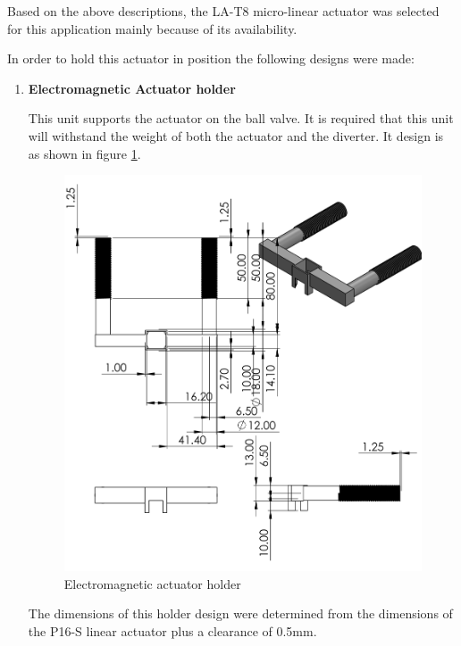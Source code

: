 Based on the above descriptions, the LA-T8 micro-linear actuator was selected for this application mainly because of its availability.
\par
In order to hold this actuator in position the following designs were made:
\begin{enumerate}
    \item \textbf{Electromagnetic Actuator holder}
    \par
    This unit supports the actuator on the ball valve. It is required that this unit will withstand the weight of both the actuator and the diverter. It design is as shown in figure \ref{fig:electromagnetic_actuator}.
    \begin{figure}[H]
        \centering
        \includegraphics[height=.5\textheight]{Figures/ElectromagnetHolder.PNG}
        \caption{Electromagnetic actuator holder}
        \label{fig:electromagnetic_actuator}
    \end{figure}
    The dimensions of this holder design were determined from the dimensions of the P16-S linear actuator plus a clearance of 0.5mm.
    

\end{enumerate}
